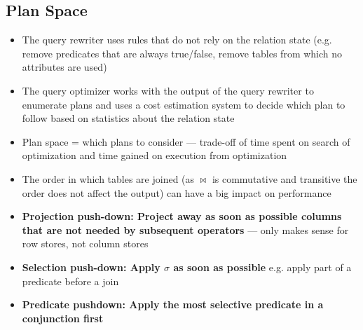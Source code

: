 \documentclass[20pt,a4paper,landscape]{extarticle}
\begin{document}
\begin{flushleft}
\subsection{Plan Space}
\begin{itemize}
\item The query rewriter uses rules that do not rely on the relation state (e.g. remove predicates that are always true/false, remove tables from which no attributes are used)
\item The query optimizer works with the output of the query rewriter to enumerate plans and uses a cost estimation system to decide which plan to follow based on statistics about the relation state
\item Plan space = which plans to consider — trade-off of time spent on search of optimization and time gained on execution from optimization
\item The order in which tables are joined (as $\bowtie$ is commutative and transitive the order does not affect the output) can have a big impact on performance
\item \textbf{Projection push-down: Project away as soon as possible columns that are not needed by subsequent operators} --- only makes sense for row stores, not column stores
\item \textbf{Selection push-down: Apply \boldmath$\sigma$ as soon as possible} e.g. apply part of a predicate before a join
\item \textbf{Predicate pushdown: Apply the most selective predicate in a conjunction first}
\end{itemize}

\end{flushleft}
\end{document}
